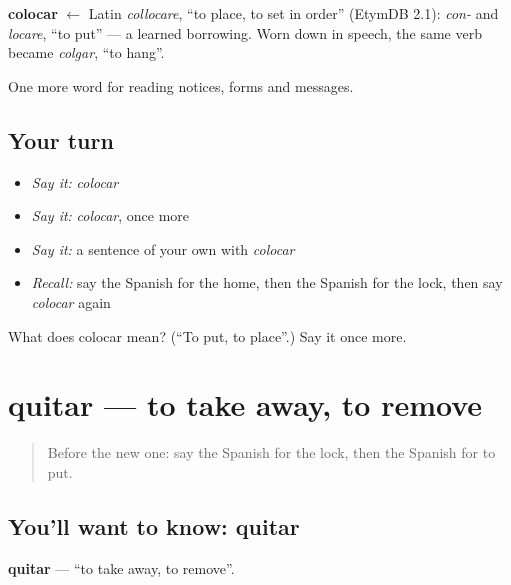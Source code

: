 \begin{cousinweb}
\textbf{colocar} $\leftarrow$ Latin \emph{collocare}, \textquotedblleft{}to place, to set in order\textquotedblright{} (EtymDB 2.1): \emph{con-} and \emph{locare}, \textquotedblleft{}to put\textquotedblright{} — a learned borrowing. Worn down in speech, the same verb became \emph{colgar}, \textquotedblleft{}to hang\textquotedblright{}.
\end{cousinweb}

\begin{grammarlens}[title={What you've built}]
One more word for reading notices, forms and messages.
\end{grammarlens}

\subsection*{Your turn}
\begin{itemize}
\raggedright
  \item \emph{Say it:} \emph{colocar}
  \item \emph{Say it:} \emph{colocar}, once more
  \item \emph{Say it:} a sentence of your own with \emph{colocar}
  \item \emph{Recall:} say the Spanish for the home, then the Spanish for the lock, then say \emph{colocar} again
\end{itemize}

\begin{tcolorbox}[breakable,colback=teal!4,colframe=teal!35!black,title={Before you move on}]
What does colocar mean? (\textquotedblleft{}To put, to place\textquotedblright{}.) Say it once more.
\end{tcolorbox}
\section[quitar]{quitar — to take away, to remove}

\label{lesson:ES-C496-quitar}



\begin{quote}
Before the new one: say the Spanish for the lock, then the Spanish for to put.
\end{quote}

\subsection*{You'll want to know: quitar}
\textbf{quitar} — \textquotedblleft{}to take away, to remove\textquotedblright{}.

